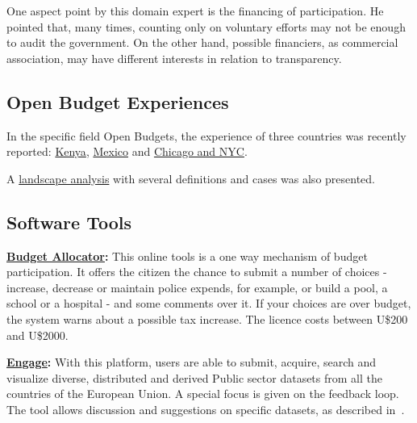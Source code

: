 One aspect point by this domain expert is the financing of participation. He pointed that, many times, counting only on voluntary efforts may not be enough to audit the government. On the other hand, possible financiers, as commercial association, may have different interests in relation to transparency.



\subsection{Open Budget Experiences}

In the specific field Open Budgets, the experience of three countries was recently reported: \href{http://fiscaltransparency.net/wp-content/uploads/2015/03/GIFT-Kenya-Webinar-Deck.pdf}{Kenya}, \href{http://fiscaltransparency.net/wp-content/uploads/2015/03/GIFT-MEX-TP-Webinar-Deck.pdf}{Mexico} and \href{http://fiscaltransparency.net/wp-content/uploads/2015/03/GIFT-Chicago-NYC-Webinar-Deck.pdf}{Chicago and NYC}.

A \href{http://pt.slideshare.net/jwyg/open-budget-data-a-landscape-analysis}{landscape analysis} with several definitions and cases was also presented.

\subsection{Software Tools}

\noindent\textbf{\href{http://budgetallocator.com/}{Budget Allocator}: } This online tools is a one way mechanism of budget participation. It offers the citizen the chance to submit a number of choices - increase, decrease or maintain police expends, for example, or build a pool, a school or a hospital - and some comments over it. If your choices are over budget, the system warns about a possible tax increase. The licence costs between U\$200 and U\$2000.

\noindent\textbf{\href{http://www.engagedata.eu/}{Engage}: } With this platform, users are able to submit, acquire, search and visualize diverse, distributed and derived Public sector datasets from all the countries of the European Union. A special focus is given on the feedback loop. The tool allows discussion and suggestions on specific datasets, as described in~\cite{Alexopoulos2014}.

